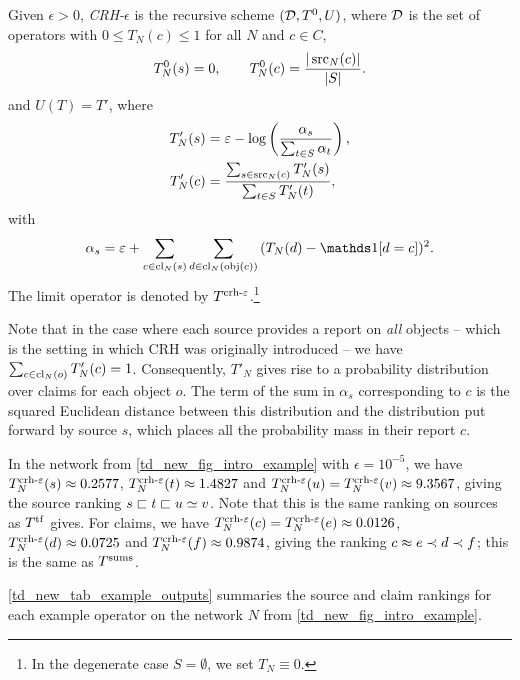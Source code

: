 \begin{definition}
    \label{td_new_def_crh}
    Given $\epsilon > 0$, \emph{CRH-$\epsilon$} is the recursive scheme $(\mathcal{D},
    T^0, U)$, where $\mathcal{D}$ is the set of operators with $0 \le T_N(c) \le 1$ for
    all $N$ and $c \in C$,
    \[
        T^0_N(s) = 0, \qquad
        T^0_N(c) = \frac{|\operatorname{src}_N(c)|}{|S|}.
    \]
    and $U(T) = T'$, where
    \begin{align*}
        T'_N(s) &= \varepsilon - \log\left(\frac{\alpha_s}{\sum_{t \in S}{\alpha_t}}\right), \\
        T'_N(c) &=
            \frac{\sum_{s \in \operatorname{src}_N(c)}{T'_N(s)}}{\sum_{t \in S}{T'_N(t)}},
    \end{align*}
    with
    \[
        \alpha_s = \epsilon + \sum_{c \in \claims_N(s)}{
            \sum_{d \in \claims_N(\obj(c))}{
                (T_N(d) - \indicator{d = c})^2
            }
        }.
    \]
    The limit operator is denoted by $T^{\operatorname{crh-{\varepsilon}}}$.\footnote{In the
    degenerate case $S = \emptyset$, we set $T_N \equiv 0$.}
\end{definition}

Note that in the case where each source provides a report on \emph{all} objects
-- which is the setting in which CRH was originally introduced -- we have
$\sum_{c \in \operatorname{cl}_N(o)}{T'_N(c)} = 1$. Consequently, $T'_N$ gives rise to a
probability distribution over claims for each object $o$. The term of the sum
in $\alpha_s$ corresponding to $c$ is the squared Euclidean distance between
this distribution and the distribution put forward by source $s$, which places
all the probability mass in their report $c$.

In the network from \cref{td_new_fig_intro_example} with $\epsilon = 10^{-5}$,
we have $T^{\operatorname{crh-{\varepsilon}}}_N(s) \approx 0.2577$, $T^{\operatorname{crh-{\varepsilon}}}_N(t) \approx
1.4827$ and $T^{\operatorname{crh-{\varepsilon}}}_N(u) = T^{\operatorname{crh-{\varepsilon}}}_N(v) \approx 9.3567$, giving
the source ranking $s \sqsubset t \sqsubset u \simeq v$.  Note that this is the same
ranking on sources as $T^{\operatorname{tf}}$ gives. For claims, we have
$T^{\operatorname{crh-{\varepsilon}}}_N(c) = T^{\operatorname{crh-{\varepsilon}}}_N(e) \approx 0.0126$,
$T^{\operatorname{crh-{\varepsilon}}}_N(d) \approx 0.0725$ and $T^{\operatorname{crh-{\varepsilon}}}_N(f) \approx 0.9874$,
giving the ranking $c \approx e \prec d \prec f$; this is the same as $T^{\operatorname{sums}}$.

\cref{td_new_tab_example_outputs} summaries the source and claim rankings for
each example operator on the network $N$ from \cref{td_new_fig_intro_example}.

